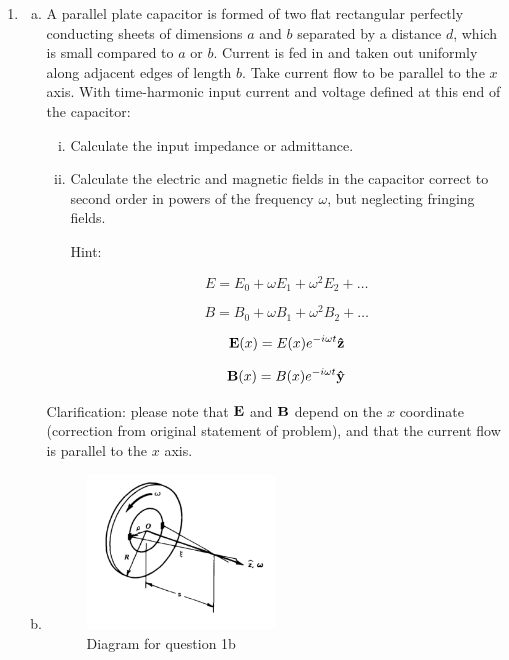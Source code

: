 \documentclass[12pt,geometry,width=8in]{article}
\begin{document}
\begin{enumerate}[(1),topsep=0pt,itemsep=0ex,partopsep=1ex,parsep=1ex]
\item
\begin{enumerate}[(a)]
\item A parallel plate capacitor is formed of two flat rectangular perfectly conducting sheets of dimensions $a$ and $b$ separated by a distance $d$, which is small compared to $a$ or $b$. Current is fed in and taken out uniformly along adjacent edges of length $b$.  Take current flow to be parallel to the $x$ axis. With time-harmonic input current and voltage defined at this end of the capacitor:

\begin{enumerate}[(i)]
\item Calculate the input impedance or admittance.
\item Calculate the electric and magnetic fields in the capacitor correct to second order in powers of the frequency $\omega$, but neglecting fringing fields.

Hint:

\[
E = E_0 + \omega E_1+ \omega^2 E_2 + \dots
\]

\[
B = B_0 + \omega B_1+ \omega^2 B_2 + \dots
\]

\[
\vb{E}(x) = E(x) e^{-i \omega t}\vu{z}
\]

\[
\vb{B}(x) = B(x) e^{-i \omega t}\vu{y}
\]
\end{enumerate}

Clarification: please note that $\vb{E}$ and $\vb{B}$ depend on the $x$ coordinate (correction from original statement of problem), and that the current flow is parallel to the $x$ axis.

\newpage
\item

\begin{figure}[h]
    \centering
    \includegraphics[width=0.5\textwidth]{disk}
    \caption{Diagram for question 1b}
    \label{disk}
\end{figure}


\end{enumerate}
\end{enumerate}
\end{document}
